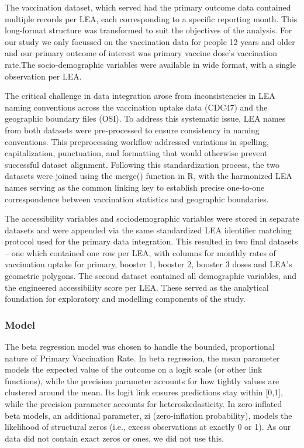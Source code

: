 \documentclass{article}
\begin{document}
The vaccination dataset, which served had the primary outcome data
contained multiple records per LEA, each corresponding to a specific
reporting month. This long-format structure was transformed to suit the
objectives of the analysis. For our study we only focussed on the
vaccination data for people 12 years and older and our primary outcome
of interest was primary vaccine dose's vaccination rate.The
socio-demographic variables were available in wide format, with a single
observation per LEA.

The critical challenge in data integration arose from inconsistencies in
LEA naming conventions across the vaccination uptake data (CDC47) and
the geographic boundary files (OSI). To address this systematic issue,
LEA names from both datasets were pre-processed to ensure consistency in
naming conventions. This preprocessing workflow addressed variations in
spelling, capitalization, punctuation, and formatting that would
otherwise prevent successful dataset alignment. Following this
standardization process, the two datasets were joined using the merge()
function in R, with the harmonized LEA names serving as the common
linking key to establish precise one-to-one correspondence between
vaccination statistics and geographic boundaries.

The accessibility variables and sociodemographic variables were stored
in separate datasets and were appended via the same standardized LEA
identifier matching protocol used for the primary data integration. This
resulted in two final datasets -- one which contained one row per LEA,
with columns for monthly rates of vaccination uptake for primary,
booster 1, booster 2, booster 3 doses and LEA's geometric polygons. The
second dataset contained all demographic variables, and the engineered
accessibility score per LEA. These served as the analytical foundation
for exploratory and modelling components of the study.

\subsubsection{Model}\label{model}

The beta regression model was chosen to handle the bounded, proportional
nature of Primary Vaccination Rate. In beta regression, the mean
parameter models the expected value of the outcome on a logit scale (or
other link functions), while the precision parameter accounts for how
tightly values are clustered around the mean. Its logit link ensures
predictions stay within {[}0,1{]}, while the precision parameter
accounts for heteroskedasticity. In zero-inflated beta models, an
additional parameter, zi (zero-inflation probability), models the
likelihood of structural zeros (i.e., excess observations at exactly 0
or 1). As our data did not contain exact zeros or ones, we did not use
this.
\end{document}
